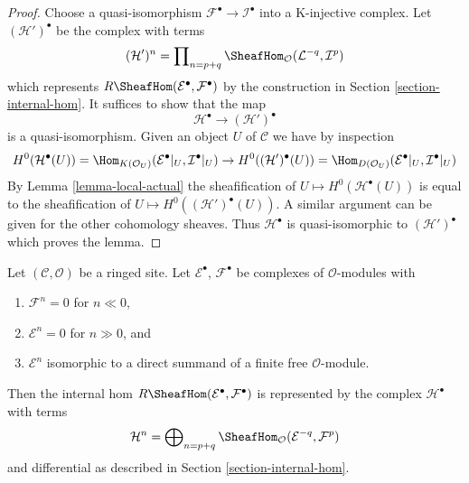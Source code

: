 \begin{proof}
Choose a quasi-isomorphism $\mathcal{F}^\bullet \to \mathcal{I}^\bullet$
into a K-injective complex. Let $(\mathcal{H}')^\bullet$ be the
complex with terms
$$
(\mathcal{H}')^n =
\prod\nolimits_{n = p + q}
\SheafHom_\mathcal{O}(\mathcal{L}^{-q}, \mathcal{I}^p)
$$
which represents $R\SheafHom(\mathcal{E}^\bullet, \mathcal{F}^\bullet)$
by the construction in Section \ref{section-internal-hom}. It suffices
to show that the map
$$
\mathcal{H}^\bullet \longrightarrow (\mathcal{H}')^\bullet
$$
is a quasi-isomorphism. Given an object $U$ of $\mathcal{C}$ we have
by inspection
$$
H^0(\mathcal{H}^\bullet(U)) =
\Hom_{K(\mathcal{O}_U)}(\mathcal{E}^\bullet|_U, \mathcal{I}^\bullet|_U)
\to
H^0((\mathcal{H}')^\bullet(U)) =
\Hom_{D(\mathcal{O}_U)}(\mathcal{E}^\bullet|_U, \mathcal{I}^\bullet|_U)
$$
By Lemma \ref{lemma-local-actual} the sheafification of
$U \mapsto H^0(\mathcal{H}^\bullet(U))$
is equal to the sheafification of
$U \mapsto H^0((\mathcal{H}')^\bullet(U))$. A similar argument can be
given for the other cohomology sheaves. Thus $\mathcal{H}^\bullet$
is quasi-isomorphic to $(\mathcal{H}')^\bullet$ which proves the lemma.
\end{proof}

\begin{lemma}
\label{lemma-Rhom-complex-of-direct-summands-finite-free}
Let $(\mathcal{C}, \mathcal{O})$ be a ringed site.
Let $\mathcal{E}^\bullet$, $\mathcal{F}^\bullet$ be complexes
of $\mathcal{O}$-modules with
\begin{enumerate}
\item $\mathcal{F}^n = 0$ for $n \ll 0$,
\item $\mathcal{E}^n = 0$ for $n \gg 0$, and
\item $\mathcal{E}^n$ isomorphic to a direct summand of a finite
free $\mathcal{O}$-module.
\end{enumerate}
Then the internal hom $R\SheafHom(\mathcal{E}^\bullet, \mathcal{F}^\bullet)$
is represented by the complex $\mathcal{H}^\bullet$ with terms
$$
\mathcal{H}^n =
\bigoplus\nolimits_{n = p + q}
\SheafHom_\mathcal{O}(\mathcal{E}^{-q}, \mathcal{F}^p)
$$
and differential as described in Section \ref{section-internal-hom}.
\end{lemma}

